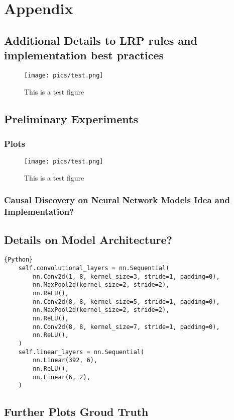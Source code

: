 \chapter{Appendix}\label{chapter:Appendix}


\section{Additional Details to LRP rules and implementation best practices}
\label{appendix:lrprules}
\begin{figure}[ht]
	\centering
	\label{fig:tesfigure}
	\texttt{[image: pics/test.png]}
	\caption[Test Figure]{This is a test figure}
\end{figure}

\section{Preliminary Experiments}
\subsection{Plots}
\begin{figure}[ht]
	\centering
	\label{fig:blafigure}
	\texttt{[image: pics/test.png]}
	\caption[Test Figure 2]{This is a test figure}
\end{figure}
\subsection{Causal Discovery on Neural Network Models Idea and Implementation?}


\section{Details on Model Architecture?}

\begin{lstlisting}{Python}
	self.convolutional_layers = nn.Sequential(
		nn.Conv2d(1, 8, kernel_size=3, stride=1, padding=0),
		nn.MaxPool2d(kernel_size=2, stride=2),
		nn.ReLU(),
		nn.Conv2d(8, 8, kernel_size=5, stride=1, padding=0),
		nn.MaxPool2d(kernel_size=2, stride=2),
		nn.ReLU(),
		nn.Conv2d(8, 8, kernel_size=7, stride=1, padding=0),
		nn.ReLU(),
	)
	self.linear_layers = nn.Sequential(
		nn.Linear(392, 6),
		nn.ReLU(),
		nn.Linear(6, 2),
	)
\end{lstlisting}

\section{Further Plots Groud Truth}
